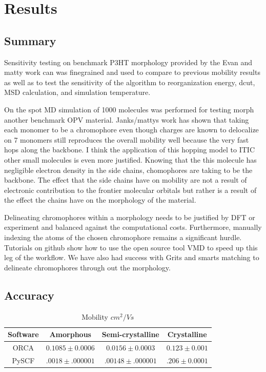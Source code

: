 \chapter{Results}
\label{chap:results}

\section{Summary}

Sensitivity testing on benchmark P3HT morphology provided by the Evan and matty work can was finegrained and
used to compare to previous mobility results as well as to test the sensitivity of the algorithm to
reorganization energy, dcut, MSD calculation, and simulation temperature.

On the spot MD simulation of 1000
molecules was performed for testing morph another benchmark OPV material. Janks/mattys work has shown that taking
each monomer to be a chromophore even though charges are known to delocalize on 7 monomers still reproduces
the overall mobility well because the very fast hops along the backbone. I think the application of this
hopping model to ITIC other small molecules is even more justified. Knowing that the this molecule has
negligible electron density in the side chains, chomophores are taking to be the backbone. The effect that
the side chains have on mobility are not a result of electronic contribution to the frontier molecular
orbitals but rather is a result of the effect the chains have on the morphology of the material. 

Delineating chromophores within a morphology needs to be justified by DFT or experiment and balanced against
the computational costs. Furthermore, manually indexing the atoms of the chosen chromophore
remains a significant hurdle. Tutorials on github show how to use the open source tool VMD to speed up this
leg of the workflow. We have also had success with Grits and smarts matching to delineate chromophores through
out the morphology. 

\section{Accuracy}

\begin{table}[ht]
    \caption{Mobility $cm^{2}/Vs$} %
\centering %
\begin{tabular}{c c c c} %
\hline\hline %
Software & Amorphous & Semi-crystalline & Crystalline \\ [0.5ex] %
\hline %
    ORCA & $0.1085 \pm 0.0006$ & $0.0156 \pm 0.0003$ & $0.123 \pm 0.001$ \\ %
PySCF & $.0018 \pm .000001$ & $.00148 \pm .000001$ & $.206 \pm 0.0001$ \\ [1ex] %
\hline %
\end{tabular}
\label{table:nonlin} %
\end{table}

